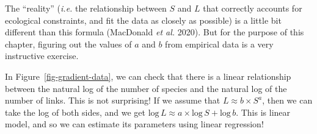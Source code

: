 \documentclass[
  letterpaper,
]{scrbook}
\begin{document}
The ``reality'' (\emph{i.e.} the relationship between \(S\) and \(L\)
that correctly accounts for ecological constraints, and fit the data as
closely as possible) is a little bit different than this formula
(MacDonald \emph{et al.} 2020). But for the purpose of this chapter,
figuring out the values of \(a\) and \(b\) from empirical data is a very
instructive exercise.

In Figure~\ref{fig-gradient-data}, we can check that there is a linear
relationship between the natural log of the number of species and the
natural log of the number of links. This is not surprising! If we assume
that \(L \approx b\times S^a\), then we can take the log of both sides,
and we get
\(\text{log}\, L \approx a \times \text{log}\, S + \text{log}\,b\). This
is linear model, and so we can estimate its parameters using linear
regression!
\end{document}
